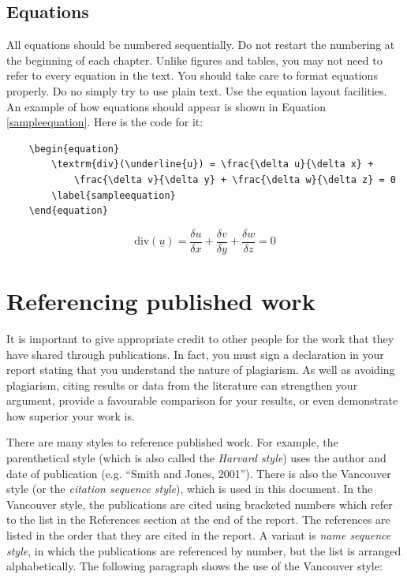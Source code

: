 \subsection{Equations}
All equations should be numbered sequentially. Do not restart the numbering at the beginning of each chapter. Unlike figures and tables, you may not need to refer to every equation in the text. You should take care to format equations properly. Do no simply try to use plain text. Use the equation layout facilities. An example of how equations should appear is shown in Equation \ref{sampleequation}. Here is the code for it:

\begin{verbatim}
	\begin{equation}
		\textrm{div}(\underline{u}) = \frac{\delta u}{\delta x} + 
		    \frac{\delta v}{\delta y} + \frac{\delta w}{\delta z} = 0
		\label{sampleequation}
	\end{equation} 
\end{verbatim}

\begin{equation}
	\textrm{div}(\underline{u}) = \frac{\delta u}{\delta x} + \frac{\delta v}{\delta y} + \frac{\delta w}{\delta z} = 0
	\label{sampleequation}
\end{equation} 

\section{Referencing published work}
It is important to give appropriate credit to other people for the work that they have shared through publications. In fact, you must sign a declaration in your report stating that you understand the nature of plagiarism. As well as avoiding plagiarism, citing results or data from the literature can strengthen your argument, provide a favourable comparison for your results, or even demonstrate how superior your work is.

There are many styles to reference published work. For example, the parenthetical style (which is also called the \emph{Harvard style}) uses the author and date of publication (e.g. ``Smith and Jones, 2001''). There is also the Vancouver style (or the \emph{citation sequence style}), which is used in this document. In the Vancouver style, the publications are cited using bracketed numbers which refer to the list in the References section at the end of the report. The references are listed in the order that they are cited in the report. A variant is \emph{name sequence style}, in which the publications are referenced by number, but the list is arranged alphabetically. The following paragraph shows the use of the Vancouver style: 

